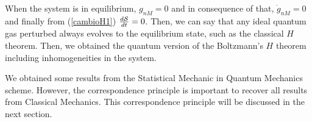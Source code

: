 When the system is in equilibrium, $g_{nM}=0$ and in consequence of that, $\dot
g_{nM}=0$ and finally from (\ref{cambioH1}) $\frac{d\mathcal{S}}{dt}=0$. Then, we can
say that any ideal quantum gas perturbed always evolves to the equilibrium
state, such as the classical $H$ theorem. Then, we obtained the quantum version
of the Boltzmann's $H$ theorem including inhomogeneities in the system.

We obtained some results from the Statistical Mechanic in Quantum Mechanics
scheme. However, the correspondence principle is important to recover all
results from Classical Mechanics. This correspondence principle will be
discussed in the next section.

 


